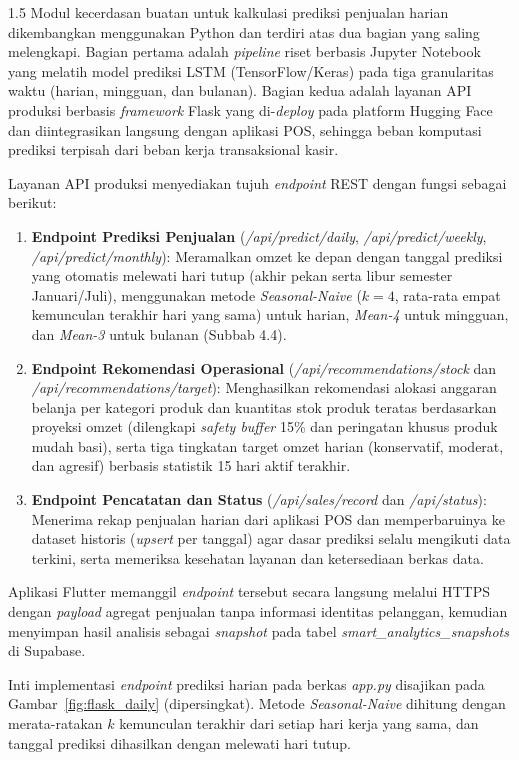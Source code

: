 \documentclass[12pt, a4paper, onecolumn, oneside]{report}
\begin{document}
\begin{spacing}{1.5}
Modul kecerdasan buatan untuk kalkulasi prediksi penjualan harian dikembangkan menggunakan Python dan terdiri atas dua bagian yang saling melengkapi. Bagian pertama adalah \textit{pipeline} riset berbasis Jupyter Notebook yang melatih model prediksi LSTM (TensorFlow/Keras) pada tiga granularitas waktu (harian, mingguan, dan bulanan). Bagian kedua adalah layanan API produksi berbasis \textit{framework} Flask yang di-\textit{deploy} pada platform Hugging Face dan diintegrasikan langsung dengan aplikasi POS, sehingga beban komputasi prediksi terpisah dari beban kerja transaksional kasir.

Layanan API produksi menyediakan tujuh \textit{endpoint} REST dengan fungsi sebagai berikut:
\begin{enumerate}
    \item \textbf{Endpoint Prediksi Penjualan} (\textit{/api/predict/daily}, \textit{/api/predict/weekly}, \textit{/api/predict/monthly}): Meramalkan omzet ke depan dengan tanggal prediksi yang otomatis melewati hari tutup (akhir pekan serta libur semester Januari/Juli), menggunakan metode \textit{Seasonal-Naive} ($k=4$, rata-rata empat kemunculan terakhir hari yang sama) untuk harian, \textit{Mean-4} untuk mingguan, dan \textit{Mean-3} untuk bulanan (Subbab 4.4).
    \item \textbf{Endpoint Rekomendasi Operasional} (\textit{/api/recommendations/stock} dan \textit{/api/recommendations/target}): Menghasilkan rekomendasi alokasi anggaran belanja per kategori produk dan kuantitas stok produk teratas berdasarkan proyeksi omzet (dilengkapi \textit{safety buffer} 15\% dan peringatan khusus produk mudah basi), serta tiga tingkatan target omzet harian (konservatif, moderat, dan agresif) berbasis statistik 15 hari aktif terakhir.
    \item \textbf{Endpoint Pencatatan dan Status} (\textit{/api/sales/record} dan \textit{/api/status}): Menerima rekap penjualan harian dari aplikasi POS dan memperbaruinya ke dataset historis (\textit{upsert} per tanggal) agar dasar prediksi selalu mengikuti data terkini, serta memeriksa kesehatan layanan dan ketersediaan berkas data.
\end{enumerate}

Aplikasi Flutter memanggil \textit{endpoint} tersebut secara langsung melalui HTTPS dengan \textit{payload} agregat penjualan tanpa informasi identitas pelanggan, kemudian menyimpan hasil analisis sebagai \textit{snapshot} pada tabel \textit{smart\_analytics\_snapshots} di Supabase.

Inti implementasi \textit{endpoint} prediksi harian pada berkas \textit{app.py} disajikan pada Gambar~\ref{fig:flask_daily} (dipersingkat). Metode \textit{Seasonal-Naive} dihitung dengan merata-ratakan $k$ kemunculan terakhir dari setiap hari kerja yang sama, dan tanggal prediksi dihasilkan dengan melewati hari tutup.


\end{spacing}
\end{document}
